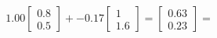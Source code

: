 \documentclass[preview]{standalone}
\begin{document}
\begin{align*}
1.00 \begin{bmatrix} 0.8 \\ 0.5 \end{bmatrix} + -0.17 \begin{bmatrix} 1 \\ 1.6 \end{bmatrix} = \begin{bmatrix} 0.63 \\ 0.23 \end{bmatrix} =
\end{align*}
\end{document}
